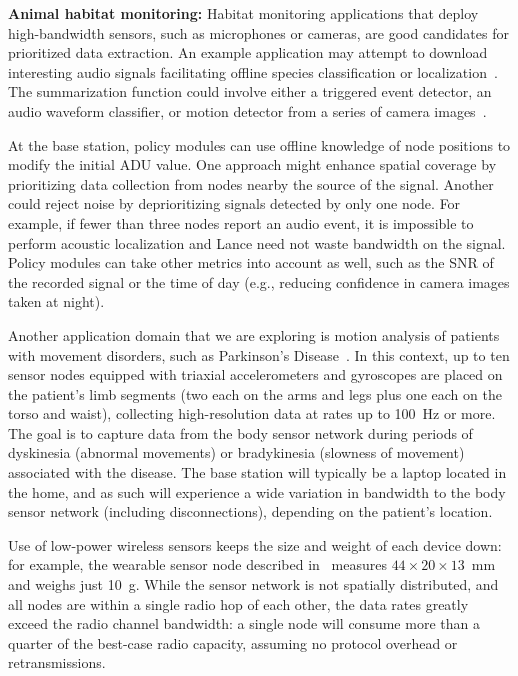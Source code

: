 {\bf Animal habitat monitoring:}
Habitat monitoring applications that deploy high-bandwidth sensors, such as
microphones or cameras, are good candidates for prioritized data extraction. 
An example application may attempt to download interesting audio signals
facilitating offline species classification or 
localization~\cite{girod-ipsn07}. The summarization function could
involve either a triggered event detector, an audio waveform
classifier, or motion detector from a series of camera images~\cite{cyclops}.

At the base station, policy modules can use offline knowledge of node
positions to modify the initial ADU value. One approach might enhance
spatial coverage by prioritizing data collection from nodes nearby the
source of the signal. Another could reject noise by deprioritizing signals
detected by only one node. For example, if fewer than three nodes
report an audio event, it is impossible to perform acoustic
localization and Lance need not waste bandwidth on the signal.
Policy modules can take other metrics into account as well, 
such as the SNR of the recorded signal or the time of day (e.g.,
reducing confidence in camera images taken at night).

Another application domain that we are exploring is motion
analysis of patients with movement disorders, such as Parkinson's
Disease~\cite{parkinsons-embs07}. In this context, up to ten sensor nodes
equipped with triaxial accelerometers and gyroscopes are placed on the
patient's limb segments (two each on the arms and legs plus one each
on the torso and waist), collecting high-resolution data at rates up to 100~Hz
or more. The goal is to capture data from the body
sensor network during periods of dyskinesia (abnormal movements) or
bradykinesia (slowness of movement) associated with the disease. 
The base station will typically 
be a laptop located in the home, and as such will experience a wide 
variation in bandwidth to the body sensor network (including
disconnections), depending on the patient's location.

Use of low-power wireless sensors keeps the size and weight
of each device down: for example, the wearable sensor node described
in~\cite{parkinsons-embs07} measures $44 \times 20 \times 13$~mm and
weighs just 10~g. 
While the sensor network is not spatially distributed, and
all nodes are within a single radio hop of each other, the data rates
greatly exceed the radio channel bandwidth: a single node will 
consume more than a quarter of the best-case radio capacity, assuming
no protocol overhead or retransmissions. 

